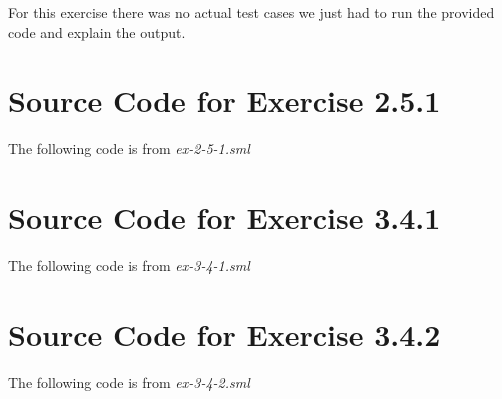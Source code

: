 \documentclass{report}
\begin{document}
For this exercise there was no actual test cases we just had to run
the provided code and explain the output.

\appendix{} 


\chapter{Source Code for  Exercise 2.5.1}
\label{cha:source-code-exercise-2-5-1}

The following code is from \emph{ex-2-5-1.sml}


\chapter{Source Code for  Exercise 3.4.1}
\label{cha:source-code-exercise-3-4-1}

The following code is from \emph{ex-3-4-1.sml}


\chapter{Source Code for  Exercise 3.4.2}
\label{cha:source-code-exercise-3-4-2}

The following code is from \emph{ex-3-4-2.sml}

\end{document}
